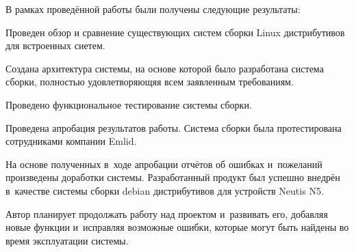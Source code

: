 
В рамках проведённой работы были получены следующие результаты:
\begin{dashitemize}
  \item Проведен обзор и сравнение существующих систем сборки Linux дистрибутивов для встроенных сиетем.
  \item Создана архитектура системы, на основе которой было разработана система сборки, полностью удовлетворяющяя всем заявленным требованиям.
  \item Проведено функциональное тестирование системы сборки.
  \item Проведена апробация результатов работы. Система сборки была протестирована сотрудниками компании Emlid.
  \item На основе полученных в~ходе апробации отчётов об ошибках и~пожеланий произведены доработки системы. Разработанный продукт был успешно внедрён в~качестве системы сборки debian дистрибутивов для устройств Neutis N5.
\end{dashitemize}

Автор планирует продолжать работу над проектом и~развивать его, добавляя новые функции и~исправляя возможные ошибки, которые могут быть найдены во время эксплуатации системы.

\newpage
